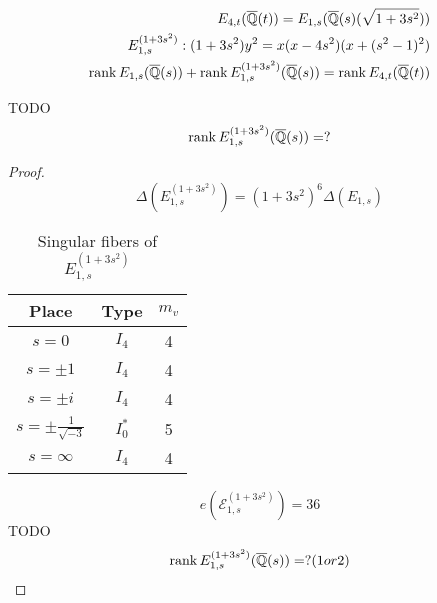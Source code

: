 \documentclass[main]{subfiles}
\begin{document}
\begin{thm}
    \begin{align}
        E_{4,t}(\overline{\mathbb{Q}}(t)) = E_{1,s}(\overline{\mathbb{Q}}(s)(\sqrt{1 + 3s^{2}})) \\
        E_{1,s}^{(1 + 3s^{2})}: (1 + 3s^{2}) y^{2} = x(x - 4s^{2})(x + (s^{2} - 1)^{2})          \\
        \operatorname{rank} E_{1,s}(\overline{\mathbb{Q}}(s)) + \operatorname{rank} E_{1,s}^{(1 + 3s^{2})}(\overline{\mathbb{Q}}(s)) = \operatorname{rank} E_{4,t}(\overline{\mathbb{Q}}(t))
    \end{align}
\end{thm}

\begin{thm}
    TODO
    \begin{equation}
        \operatorname{rank} E_{1,s}^{(1 + 3s^{2})}(\overline{\mathbb{Q}}(s)) = ?
    \end{equation}
\end{thm}

\begin{proof}
    \begin{equation}
        \Delta(E_{1,s}^{(1 + 3s^{2})}) = (1 + 3s^{2})^{6} \Delta(E_{1,s})
    \end{equation}
    \begin{table}[h]
        \centering
        \caption{Singular fibers of $E_{1,s}^{(1 + 3s^{2})}$}
        \begin{tabular}{|c|c|c|}
            \hline
            Place                        & Type    & $m_v$ \\
            \hline
            $s=0$                        & $I_4$   & 4     \\
            $s=\pm 1$                    & $I_4$   & 4     \\
            $s=\pm i$                    & $I_4$   & 4     \\
            $s=\pm \frac{1}{\sqrt{-3}} $ & $I_0^*$ & 5     \\
            $s=\infty$                   & $I_4$   & 4     \\
            \hline
        \end{tabular}
    \end{table}
    \begin{equation}
        e(\mathcal{E}_{1,s}^{(1 + 3s^{2})}) = 36
    \end{equation}
    TODO
    \begin{equation}
        \operatorname{rank} E_{1,s}^{(1 + 3s^{2})}(\overline{\mathbb{Q}}(s)) = ? (1 or 2)
    \end{equation}
\end{proof}
\end{document}
